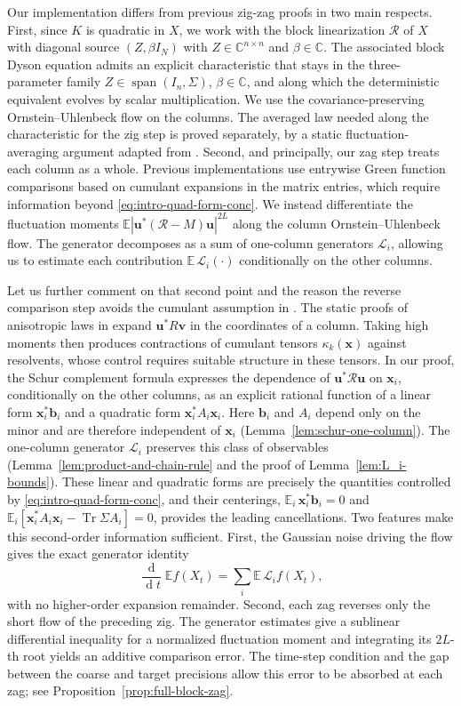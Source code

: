 \documentclass[11pt,reqno]{amsart}
\def\u{\mathbf{u}}
\def\bv{\mathbf{v}}
\def\x{\mathbf{x}}
\def\C{\mathbb{C}}
\def\E{\mathbb{E}}
\def\cL{\mathcal{L}}
\def\cR{\mathcal{R}}
\def\de{\operatorname{d}}
\def\Tr{\operatorname{Tr}}
\theoremstyle{definition}
\numberwithin{equation}{section}
\numberwithin{figure}{section}
\begin{document}
Our implementation differs from previous zig-zag proofs in two main respects. First, since $K$ is quadratic in $X$, we work with the block linearization $\cR$ of $X$ with diagonal source $(Z,\beta I_N)$ with $Z\in\C^{n\times n}$ and $\beta\in\C$. The associated block Dyson equation admits an explicit characteristic that stays in the three-parameter family $Z\in\operatorname{span}(I_n,\Sigma)$, $\beta\in\C$, and along which the deterministic equivalent evolves by scalar multiplication. We use the covariance-preserving Ornstein--Uhlenbeck flow on the columns. The averaged law needed along the characteristic for the zig step is proved separately, by a static fluctuation-averaging argument adapted from \cite{fan2026anisotropic}. Second, and principally, our zag step treats each column as a whole. Previous implementations use entrywise Green function comparisons based on cumulant expansions in the matrix entries, which require information beyond \eqref{eq:intro-quad-form-conc}. We instead differentiate the fluctuation moments $\E|\u^*(\cR-M)\u|^{2L}$ along the column Ornstein--Uhlenbeck flow. The generator decomposes as a sum of one-column generators $\cL_i$, allowing us to estimate each contribution $\E\,\cL_i(\cdot)$ conditionally on the other columns.


Let us further comment on that second point and the reason the reverse comparison step avoids the cumulant assumption in \cite{fan2026anisotropic}. The static proofs of anisotropic laws in \cite{knowles2017anisotropic,fan2026anisotropic} expand $\u^*R\bv$ in the coordinates of a column. Taking high moments then produces contractions of cumulant tensors $\kappa_k(\x)$ against resolvents, whose control requires suitable structure in these tensors. In our proof, the Schur complement formula expresses the dependence of $\u^*\cR\u$ on $\x_i$, conditionally on the other columns, as an explicit rational function of a linear form $\x_i^*\mathbf b_i$ and a quadratic form $\x_i^*A_i\x_i$. Here $\mathbf b_i$ and $A_i$ depend only on the minor and are therefore independent of $\x_i$ (Lemma~\ref{lem:schur-one-column}). The one-column generator $\cL_i$ preserves this class of observables (Lemma~\ref{lem:product-and-chain-rule} and the proof of Lemma~\ref{lem:L_i-bounds}). These linear and quadratic forms are precisely the quantities controlled by \eqref{eq:intro-quad-form-conc}, and their centerings, $\E_i\,\x_i^*\mathbf b_i=0$ and $\E_i[\x_i^*A_i\x_i-\Tr\Sigma A_i]=0$, provides the leading cancellations. Two features make this second-order information sufficient. First, the Gaussian noise driving the flow gives the exact generator identity
\[
\frac{\de}{\de t}\E f(X_t)
=
\sum_i\E\,\cL_i f(X_t),
\]
with no higher-order expansion remainder. Second, each zag reverses only the short flow of the preceding zig. The generator estimates give a sublinear differential inequality for a normalized fluctuation moment and integrating its $2L$-th root yields an additive comparison error. The time-step condition and the gap between the coarse and target precisions allow this error to be absorbed at each zag; see Proposition~\ref{prop:full-block-zag}.
\end{document}
